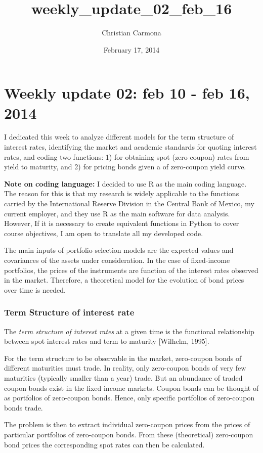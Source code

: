 \documentclass[letterpaper,10pt,english]{/anaconda/lib/python2.7/site-packages/sphinx/texinputs/sphinxhowto}
\title{weekly\_update\_02\_feb\_16}
\date{February 17, 2014}
\author{Christian Carmona}
\begin{document}
        
            \maketitle
        

        


        
        \part{Weekly update 02: feb 10 - feb 16, 2014}I dedicated this week to analyze different models for the term structure
of interest rates, identifying the market and academic standards for
quoting interest rates, and coding two functions: 1) for obtaining spot
(zero-coupon) rates from yield to maturity, and 2) for pricing bonds
given a of zero-coupon yield curve.

\textbf{Note on coding language:} I decided to use R as the main coding
language. The reason for this is that my research is widely applicable
to the functions carried by the International Reserve Division in the
Central Bank of Mexico, my current employer, and they use R as the main
software for data analysis. However, If it is necessary to create
equivalent functions in Python to cover course objectives, I am open to
translate all my developed code.

The main inputs of portfolio selection models are the expected values
and covariances of the assets under consideration. In the case of
fixed-income portfolios, the prices of the instruments are function of
the interest rates observed in the market. Therefore, a theoretical
model for the evolution of bond prices over time is needed.\section{Term Structure of interest rate}The \emph{term structure of interest rates} at a given time is the
functional relationship between spot interest rates and term to maturity
{[}Wilhelm, 1995{]}.

For the term structure to be observable in the market, zero-coupon bonds
of different maturities must trade. In reality, only zero-coupon bonds
of very few maturities (typically smaller than a year) trade. But an
abundance of traded coupon bonds exist in the fixed income markets.
Coupon bonds can be thought of as portfolios of zero-coupon bonds.
Hence, only specific portfolios of zero-coupon bonds trade.

The problem is then to extract individual zero-coupon prices from the
prices of particular portfolios of zero-coupon bonds. From these
(theoretical) zero-coupon bond prices the corresponding spot rates can
then be calculated.
\end{document}
